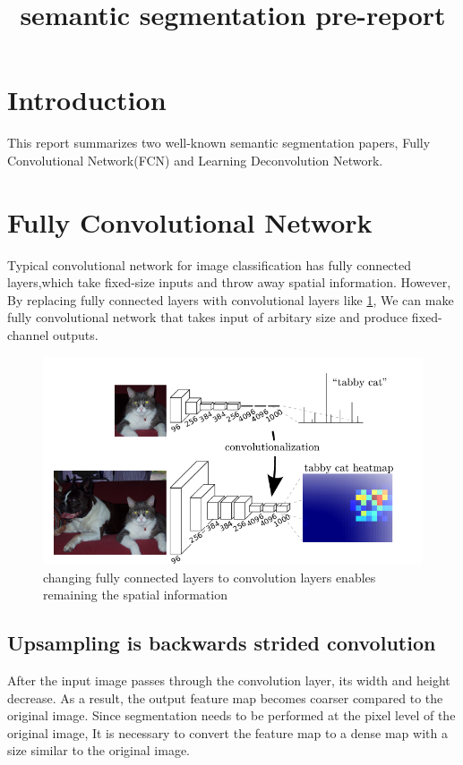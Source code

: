 \documentclass[extendedabs]{bmvc2k}
\begin{document}
\title{semantic segmentation pre-report}

 

\maketitle
\noindent

\section{Introduction}
This report summarizes two well-known semantic segmentation papers, Fully Convolutional Network(FCN)\cite{fullyconvnet} and Learning Deconvolution Network\cite{learndeconv}.

\section{Fully Convolutional Network}
Typical convolutional network for image classification has fully connected layers,which take fixed-size inputs and throw away spatial information. However, By replacing fully connected layers with convolutional layers like \ref{FCN}, We can make fully convolutional network that takes input of arbitary size and produce fixed-channel outputs.

\begin{figure}[t]
	\includegraphics[width=\linewidth]{images/fig2.png}
	\caption{
		changing fully connected layers to convolution layers enables remaining the spatial information}
	\vspace{-2mm}
 \label{FCN}
\end{figure}

\subsection{Upsampling is backwards strided convolution}
After the input image passes through the convolution layer, its width and height decrease. As a result, the output feature map becomes coarser compared to the original image. Since segmentation needs to be performed at the pixel level of the original image, It is necessary to convert the feature map to a dense map with a size similar to the original image.
\end{document}
